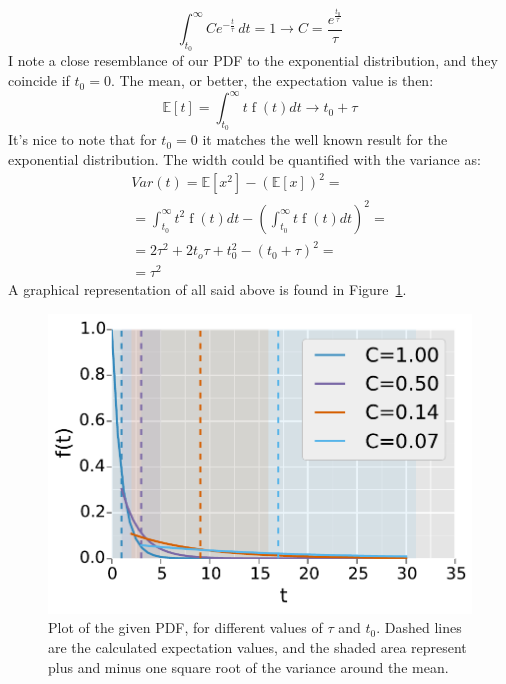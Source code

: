 \documentclass[twocolumn]{article}
\begin{document}
	\begin{equation}
		\int_{t_{{0}}}^{\infty} C e^{- \frac{t}{\tau}}\, dt = 1 \longrightarrow C =  \frac{
		e^{
		\frac{t_0}{\tau}
		}}
		{\tau}
	\end{equation}
	I note a close resemblance of our PDF to the exponential distribution, and they coincide if $t_0 = 0$. 
	The mean, or better, the expectation  value is then:
	\begin{equation}
	\mathbb{E} [t] = \int_{t_0}^{\infty} t \operatorname{f}{(t) d t } \longrightarrow  t_0 + \tau
	\end{equation}
	It's nice to note that for $t_0 = 0$ it matches the well known result for the exponential distribution.
	The width could be quantified with the variance as:
	\begin{multline}
		Var(t) = \mathbb{E}[x^2] - (\mathbb{E}[x])^2 = \\
		= 
		\int_{t_0}^{\infty} t^2 \operatorname{f}{(t) d t } 
		-(\int_{t_0}^{\infty} t \operatorname{f}{(t) d t })^2 = \\
		= 2 \tau ^ 2 + 2 t_o \tau +t_0 ^2  - ( t_0 + \tau ) ^ 2 = \\
		= \tau ^ 2
	\end{multline}
	A graphical representation of all said above is found in Figure~\ref{fig:pdf}.
	\begin{figure}[h!]
		\begin{center}
			\includegraphics[width= 0.4 \textwidth]{fig/graph.pdf}
		\end{center}
		\caption{Plot of the given PDF, for different values of $ \tau $ and $t_0 $. Dashed lines are the calculated expectation values, and the shaded area represent plus and minus one square root of the variance around the mean.}
		\label{fig:pdf}
	\end{figure}
\end{document}

